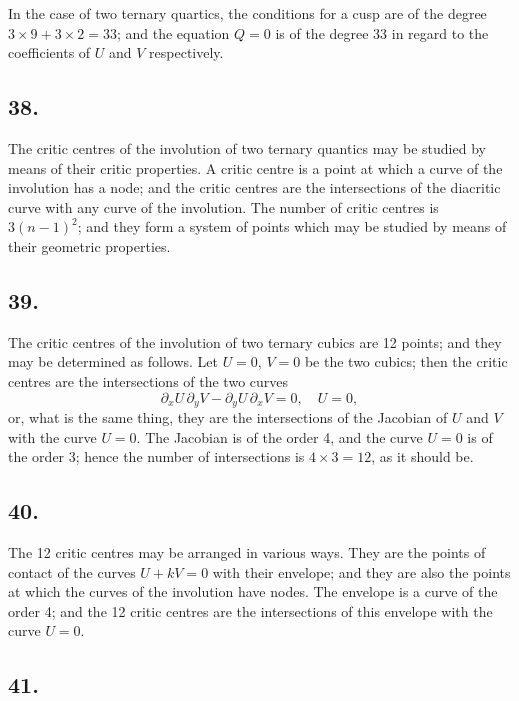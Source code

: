 \documentclass[11pt,a4paper]{article}
\theoremstyle{definition}
\begin{document}
In the case of two ternary quartics, the conditions for a cusp are of the degree
$3 \times 9 + 3 \times 2 = 33$; and the equation $Q = 0$ is of the degree 33 in regard to the coefficients
of $U$ and $V$ respectively.

\newpage
\subsection*{38.}

The critic centres of the involution of two ternary quantics may be studied by means
of their critic properties. A critic centre is a point at which a curve of the involution
has a node; and the critic centres are the intersections of the diacritic curve with any
curve of the involution. The number of critic centres is $3(n - 1)^{2}$; and they form a system
of points which may be studied by means of their geometric properties.

\subsection*{39.}

The critic centres of the involution of two ternary cubics are 12 points; and they may
be determined as follows. Let $U = 0$, $V = 0$ be the two cubics; then the critic centres are
the intersections of the two curves
\[
\partial_{x}U\,\partial_{y}V - \partial_{y}U\,\partial_{x}V = 0,\quad U = 0,
\]
or, what is the same thing, they are the intersections of the Jacobian of $U$ and $V$ with
the curve $U = 0$. The Jacobian is of the order 4, and the curve $U = 0$ is of the order 3;
hence the number of intersections is $4 \times 3 = 12$, as it should be.

\subsection*{40.}

The 12 critic centres may be arranged in various ways. They are the points of
contact of the curves $U + kV = 0$ with their envelope; and they are also the points at
which the curves of the involution have nodes. The envelope is a curve of the order 4;
and the 12 critic centres are the intersections of this envelope with the curve $U = 0$.

\newpage
\subsection*{41.}
\end{document}
